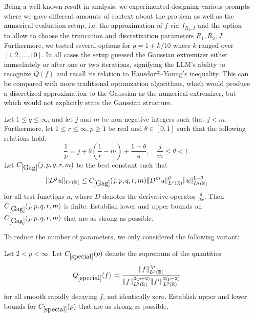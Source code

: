 Being a well-known result in analysis, we experimented designing various prompts where we gave \AlphaEvolve different amounts of context about the problem as well as the numerical evaluation setup, i.e. the approximation of $f$ via $f_{R_1, J}$ and the option to allow \AlphaEvolve to choose the truncation and discretization parameters $R_1, R_2, J$. Furthermore, we tested several options for $p = 1 + k / 10$ where $k$ ranged over $[1, 2, \dots, 10]$. In all cases the setup guessed the Gaussian extremizer either immediately or after one or two iterations, signifying the LLM's ability to recognize $Q(f)$ and recall its relation to Hausdorff--Young's inequality.  This can be compared with more traditional optimization algorithms, which would produce a discretized approximation to the Gaussian as the numerical extremizer, but which would not explicitly state the Gaussian structure.

\renewcommand{\problemURL}{https://google-deepmind.github.io/alphaevolve_repository_of_problems/problems/15.html}

\begin{problem}\label{Gag} 
Let $1 \leq q \leq \infty$, and let $j$ and $m$ be non-negative integers such that $j < m$. Furthermore, let $1 \leq r \leq \infty, p \geq 1$ be real and $\theta \in [0, 1]$ such that the following relations hold:
$$\frac{1}{p} = j + \theta \left( \frac{1}{r} - m \right) + \frac{1 - \theta}{q}, \quad \frac{j}{m} \leq \theta < 1.$$
Let $C_{\ref{Gag}}(j,p,q,r,m)$ be the best constant such that
$$\|D^j u\|_{L^p(\mathbb{R})} \leq C_{\ref{Gag}}(j,p,q,r,m) \|D^m u\|_{L^r(\mathbb{R})}^\theta \|u\|_{L^q(\mathbb{R})}^{1-\theta}$$
for all test functions $u$, where $D$ denotes the derivative operator $\frac{d}{dx}$. Then $C_{\ref{Gag}}(j,p,q,r,m)$ is finite. Establish lower and upper bounds on $C_{\ref{Gag}}(j,p,q,r,m)$ that are as strong as possible.
\end{problem}

  To reduce the number of parameters, we only considered the following variant:



\renewcommand{\problemURL}{https://google-deepmind.github.io/alphaevolve_repository_of_problems/problems/16.html}

\begin{problem}\label{special}  Let $2 < p < \infty$.  Let $C_{\ref{special}}(p)$ denote the supremum of the quantities
$$ Q_{\ref{special}}(f) \coloneqq \frac{\|f\|_{L^p(\mathbb{R})}^{4p}}{\|f\|_{L^2(\mathbb{R})}^{2(p+2)} \|f'\|_{L^2(\mathbb{R})}^{2(p-2)}}$$
for all smooth rapidly decaying $f$, not identically zero. Establish upper and lower bounds for $C_{\ref{special}}(p)$ that are as strong as possible.
\end{problem}

